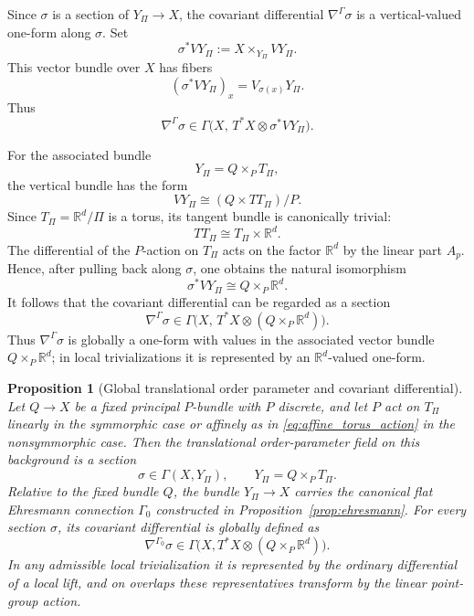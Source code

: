 \documentclass[11pt]{amsart}
\theoremstyle{plain}
\newtheorem{proposition}{Proposition}[section]
\theoremstyle{definition}
\theoremstyle{remark}
\begin{document}
Since \(\sigma\) is a section of \(Y_\Pi\to X\), the covariant differential \(\nabla^\Gamma\sigma\) is a vertical-valued one-form along \(\sigma\). 
Set
\begin{equation}
	\sigma^*VY_\Pi
	:=
	X\times_{Y_\Pi}VY_\Pi.
	\label{eq:pullback_vertical}
\end{equation}
This vector bundle over \(X\) has fibers
\begin{equation}
	(\sigma^*VY_\Pi)_x
	=
	V_{\sigma(x)}Y_\Pi.
	\label{eq:pullback_vertical_fibers}
\end{equation}
Thus
\begin{equation}
	\nabla^\Gamma\sigma
	\in
	\Gamma\bigl(X,\,T^*X\otimes \sigma^*VY_\Pi\bigr).
	\label{eq:covariant_section}
\end{equation}

For the associated bundle
\[
Y_\Pi = Q\times_P T_\Pi,
\]
the vertical bundle has the form
\[
VY_\Pi \cong (Q\times TT_\Pi)/P.
\]
Since \(T_\Pi=\mathbb R^d/\Pi\) is a torus, its tangent bundle is canonically trivial:
\[
TT_\Pi \cong T_\Pi\times \mathbb R^d.
\]
The differential of the \(P\)-action on \(T_\Pi\) acts on the factor \(\mathbb R^d\) by the linear part \(A_p\). 
Hence, after pulling back along \(\sigma\), one obtains the natural isomorphism
\begin{equation}
	\sigma^*VY_\Pi \cong Q\times_P \mathbb R^d.
	\label{eq:sigma_pullback_vertical_trivialized}
\end{equation}
It follows that the covariant differential can be regarded as a section
\begin{equation}
	\nabla^\Gamma\sigma
	\in
	\Gamma\bigl(X,\,T^*X\otimes (Q\times_P \mathbb R^d)\bigr).
	\label{eq:covariant_target_bundle}
\end{equation}
Thus \(\nabla^\Gamma\sigma\) is globally a one-form with values in the associated vector bundle \(Q\times_P\mathbb R^d\); in local trivializations it is represented by an \(\mathbb R^d\)-valued one-form.

\begin{proposition}[Global translational order parameter and covariant differential]
	\label{prop:global_phonon_covariant_differential}
	Let \(Q\to X\) be a fixed principal \(P\)-bundle with \(P\) discrete, and let \(P\) act on \(T_\Pi\) linearly in the symmorphic case or affinely as in \eqref{eq:affine_torus_action} in the nonsymmorphic case. 
	Then the translational order-parameter field on this background is a section
	\[
	\sigma\in\Gamma(X,Y_\Pi),
	\qquad
	Y_\Pi=Q\times_P T_\Pi.
	\]
	Relative to the fixed bundle \(Q\), the bundle \(Y_\Pi\to X\) carries the canonical flat Ehresmann connection \(\Gamma_0\) constructed in Proposition~\ref{prop:ehresmann}. 
	For every section \(\sigma\), its covariant differential is globally defined as
	\begin{equation}
		\nabla^{\Gamma_0}\sigma
		\in
		\Gamma\bigl(X,T^*X\otimes(Q\times_P\mathbb R^d)\bigr).
		\label{eq:main_global_covariant_differential}
	\end{equation}
	In any admissible local trivialization it is represented by the ordinary differential of a local lift, and on overlaps these representatives transform by the linear point-group action.
\end{proposition}
\end{document}
